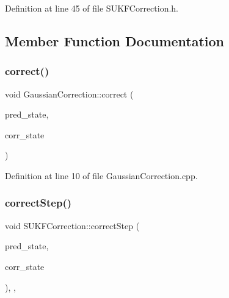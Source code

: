 Definition at line 45 of file S\+U\+K\+F\+Correction.\+h.



\subsection{Member Function Documentation}
\mbox{\label{classbfl_1_1GaussianCorrection_a6308c8af37a1a451eba8e87e73952c84}} 
\subsubsection{\texorpdfstring{correct()}{correct()}}
{\footnotesize\ttfamily void Gaussian\+Correction\+::correct (\begin{DoxyParamCaption}\item[{const \mbox{\hyperlink{classbfl_1_1GaussianMixture}{Gaussian\+Mixture}} \&}]{pred\+\_\+state,  }\item[{\mbox{\hyperlink{classbfl_1_1GaussianMixture}{Gaussian\+Mixture}} \&}]{corr\+\_\+state }\end{DoxyParamCaption})\hspace{0.3cm}{\ttfamily [inherited]}}



Definition at line 10 of file Gaussian\+Correction.\+cpp.

\mbox{\label{classbfl_1_1SUKFCorrection_af58d64c5e6c1ef373df94e4c4179226b}} 
\subsubsection{\texorpdfstring{correct\+Step()}{correctStep()}}
{\footnotesize\ttfamily void S\+U\+K\+F\+Correction\+::correct\+Step (\begin{DoxyParamCaption}\item[{const \mbox{\hyperlink{classbfl_1_1GaussianMixture}{Gaussian\+Mixture}} \&}]{pred\+\_\+state,  }\item[{\mbox{\hyperlink{classbfl_1_1GaussianMixture}{Gaussian\+Mixture}} \&}]{corr\+\_\+state }\end{DoxyParamCaption})\hspace{0.3cm}{\ttfamily [override]}, {\ttfamily [protected]}, {\ttfamily [virtual]}}



